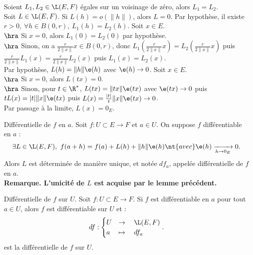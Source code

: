 \documentclass[11pt]{article}
\begin{document}
\begin{lemme}{}{}
    Soient $L_1,L_2\in\L(E,F)$ égales sur un voisinage de zéro, alors $L_1=L_2$.\\
    Soit $L\in\L(E,F)$. Si $L(h)=o(\|h\|)$, alors $L=0$.
    \tcblower
     Par hypothèse, il existe $r>0, ~ \forall h \in B(0,r), ~ L_1(h)=L_2(h)$. Soit $x\in E$.\\
    $\hra$ Si $x=0$, alors $L_1(0)=L_2(0)$ par hypothèse.\\
    $\hra$ Sinon, on a $\frac{r}{2\|x\|}x\in B(0,r)$, donc $L_1(\frac{r}{2\|x\|}x)=L_2(\frac{r}{2\|x\|}x)$ puis $\frac{r}{2\|x\|}L_1(x)=\frac{r}{2\|x\|}L_2(x)$ puis $L_1(x)=L_2(x)$.\\
     Par hypothèse, $L(h)=\|h\|\e(h)$ avec $\e(h)\to0$. Soit $x\in E$.\\
    $\hra$ Si $x=0$, alors $L(tx)=0$.\\
    $\hra$ Sinon, pour $t\in\R^*$, $L(tx)=\|tx\|\e(tx)$ avec $\e(tx)\to0$ puis $tL(x)=|t|\|x\|\e(tx)$ puis $L(x)=\frac{|t|}{t}\|x\|\e(tx)\to0$.\\
    Par passage à la limite, $L(x)=0_E$.
\end{lemme}

\begin{defi}{Différentielle de $f$ en $a$.}{}
    Soit $f:U\subset E\to F$ et $a\in U$. On suppose $f$ différentiable en $a$ :
    \begin{equation*}
        \exists L \in \L(E,F), ~ f(a+h) = f(a) + L(h) + \|h\|\e(h) \nt{ avec } \e(h)\xrightarrow[h\to0_E]{}0.
    \end{equation*}
    Alors $L$ est déterminée de manière unique, et notée $df_a$, appelée différentielle de $f$ en $a$.\\
    \bf{Remarque.} L'unicité de $L$ est acquise par le lemme précédent.
\end{defi}

\begin{defi}{Différentielle de $f$ sur $U$.}{}
    Soit $f:U\subset E \to F$. Si $f$ est différentiable en $a$ pour tout $a\in U$, alors $f$ est différentiable sur $U$ et :
    \begin{equation*}
        df : \begin{cases} U &\to \quad \L(E,F) \\ a &\mapsto \quad df_a\end{cases}.
    \end{equation*}
    est la différentielle de $f$ sur $U$.
\end{defi}
\end{document}
